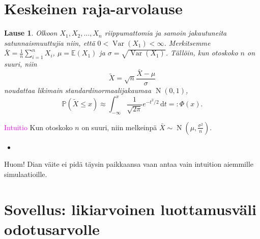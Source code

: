 \documentclass{beamer}
\newtheorem{teoreema}{Lause}
\DeclareMathOperator{\var}{Var}
\DeclareMathOperator{\n}{\mathrm N}
\begin{document}

\section{Keskeinen raja-arvolause}


\begin{frame}
  \begin{teoreema}
    Olkoon $X_1, X_2, \ldots, X_n$ riippumattomia ja samoin jakautuneita
    satunnaismuuttujia niin, että $0 < \var\left(X_1\right) < \infty$.
    Merkitsemme $\bar X = \frac{1}{n}\sum_{i = 1}^n X_i$, $\mu =
    \mathbb{E}\left(X_1\right)$ ja $\sigma = \sqrt{\var\left(X_1\right)}$.
    Tällöin, kun otoskoko $n$ on suuri, niin
    \begin{equation*}
      \tilde X = \sqrt{n}\frac{\bar X - \mu}{\sigma}
    \end{equation*}
    noudattaa likimain standardinormaalijakaumaa $\n\left(0, 1\right)$,
    \pause
    \begin{equation*}
      \mathbb{P}\left(\tilde X \leq x\right) \approx
      \int_{-\infty}^x \frac{1}{\sqrt{2\pi}}e^{-t^2/2}\,\mathrm{d}t =:
      \Phi\left(x\right).
    \end{equation*}
  \end{teoreema}
\end{frame}


\begin{frame}{\textcolor{magenta}{Intuitio}}
  Kun otoskoko $n$ on suuri, niin melkeinpä $\bar X \sim \n\left(\mu,
  \frac{\sigma^2}{n}\right)$.
  \begin{itemize}
    \item[]
  \end{itemize}
  \pause
  Huom! Dian väite ei pidä täysin paikkaansa vaan antaa vain intuition aiemmille
  simulaatioille.
\end{frame}


\section{Sovellus: likiarvoinen luottamusväli odotusarvolle}

\end{document}
